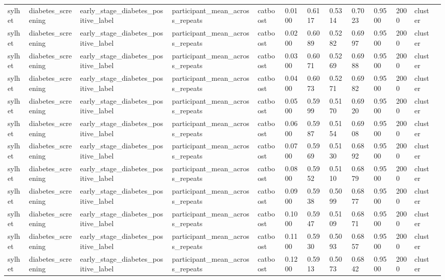 \begin{tabular}{lllllllllllll}
sylhet & diabetes\_screening & early\_stage\_diabetes\_positive\_label & participant\_mean\_across\_repeats & catboost & 0.0100 & 0.6117 & 0.5314 & 0.7023 & 0.9500 & 2000 & cluster &  \\
sylhet & diabetes\_screening & early\_stage\_diabetes\_positive\_label & participant\_mean\_across\_repeats & catboost & 0.0200 & 0.6089 & 0.5282 & 0.6997 & 0.9500 & 2000 & cluster &  \\
sylhet & diabetes\_screening & early\_stage\_diabetes\_positive\_label & participant\_mean\_across\_repeats & catboost & 0.0300 & 0.6071 & 0.5269 & 0.6988 & 0.9500 & 2000 & cluster &  \\
sylhet & diabetes\_screening & early\_stage\_diabetes\_positive\_label & participant\_mean\_across\_repeats & catboost & 0.0400 & 0.6073 & 0.5271 & 0.6982 & 0.9500 & 2000 & cluster &  \\
sylhet & diabetes\_screening & early\_stage\_diabetes\_positive\_label & participant\_mean\_across\_repeats & catboost & 0.0500 & 0.5999 & 0.5170 & 0.6920 & 0.9500 & 2000 & cluster &  \\
sylhet & diabetes\_screening & early\_stage\_diabetes\_positive\_label & participant\_mean\_across\_repeats & catboost & 0.0600 & 0.5987 & 0.5154 & 0.6908 & 0.9500 & 2000 & cluster &  \\
sylhet & diabetes\_screening & early\_stage\_diabetes\_positive\_label & participant\_mean\_across\_repeats & catboost & 0.0700 & 0.5969 & 0.5130 & 0.6892 & 0.9500 & 2000 & cluster &  \\
sylhet & diabetes\_screening & early\_stage\_diabetes\_positive\_label & participant\_mean\_across\_repeats & catboost & 0.0800 & 0.5952 & 0.5110 & 0.6879 & 0.9500 & 2000 & cluster &  \\
sylhet & diabetes\_screening & early\_stage\_diabetes\_positive\_label & participant\_mean\_across\_repeats & catboost & 0.0900 & 0.5938 & 0.5099 & 0.6877 & 0.9500 & 2000 & cluster &  \\
sylhet & diabetes\_screening & early\_stage\_diabetes\_positive\_label & participant\_mean\_across\_repeats & catboost & 0.1000 & 0.5947 & 0.5109 & 0.6871 & 0.9500 & 2000 & cluster &  \\
sylhet & diabetes\_screening & early\_stage\_diabetes\_positive\_label & participant\_mean\_across\_repeats & catboost & 0.1100 & 0.5930 & 0.5093 & 0.6857 & 0.9500 & 2000 & cluster &  \\
sylhet & diabetes\_screening & early\_stage\_diabetes\_positive\_label & participant\_mean\_across\_repeats & catboost & 0.1200 & 0.5913 & 0.5073 & 0.6842 & 0.9500 & 2000 & cluster &  \\

\end{tabular}
